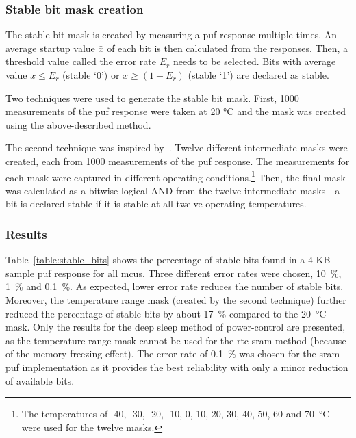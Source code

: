 \subsubsection*{Stable bit mask creation}

The stable bit mask is created by measuring a \gls{puf} response multiple times. An average startup value $\bar{x}$ of each bit is then calculated from the responses. Then, a threshold value called the error rate $E_r$ needs to be selected. Bits with average value $\bar{x} \leq E_r$ (stable `0') or $\bar{x} \geq (1-E_r)$ (stable `1') are declared as stable.

Two techniques were used to generate the stable bit mask. First, 1000 measurements of the \gls{puf} response were taken at 20 °C and the mask was created using the above-described method.

The second technique was inspired by~\cite{Hanova2020}. Twelve different intermediate masks were created, each from 1000 measurements of the \gls{puf} response. The measurements for each mask were captured in different operating conditions.\footnote{The temperatures of -40, -30, -20, -10, 0, 10, 20, 30, 40, 50, 60 and 70~°C were used for the twelve masks.} Then, the final mask was calculated as a bitwise logical AND from the twelve intermediate masks---a bit is declared stable if it is stable at all twelve operating temperatures.

\subsubsection*{Results}

Table~\ref{table:stable_bits} shows the percentage of stable bits found in a 4 KB sample \gls{puf} response for all \glspl{mcu}. Three different error rates were chosen, 10~\%, 1~\% and 0.1~\%. As expected, lower error rate reduces the number of stable bits. Moreover, the temperature range mask (created by the second technique) further reduced the percentage of stable bits by about 17~\% compared to the 20~°C mask. Only the results for the deep sleep method of power-control are presented, as the temperature range mask cannot be used for the \gls{rtc} \gls{sram} method (because of the memory freezing effect). The error rate of 0.1~\% was chosen for the \gls{sram} \gls{puf} implementation as it provides the best reliability with only a minor reduction of available bits.


